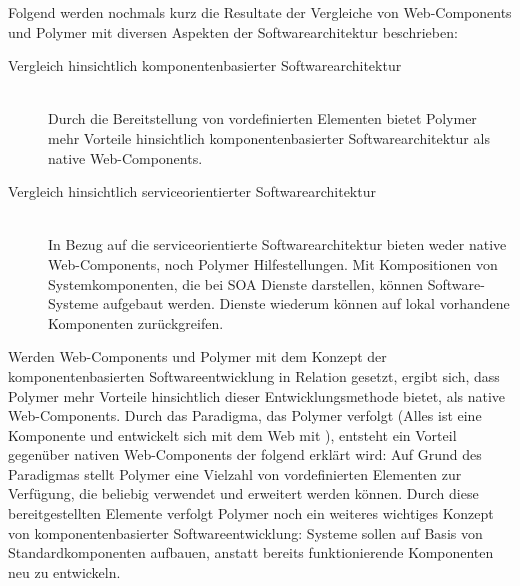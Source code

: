Folgend werden nochmals kurz die Resultate der Vergleiche von Web-Components und Polymer mit diversen Aspekten der Softwarearchitektur beschrieben:

\begin{description}
\item[Vergleich hinsichtlich komponentenbasierter Softwarearchitektur] \hfill \\
Durch die Bereitstellung von vordefinierten Elementen bietet Polymer mehr Vorteile hinsichtlich komponentenbasierter Softwarearchitektur als native Web-Components.

\item[Vergleich hinsichtlich serviceorientierter Softwarearchitektur] \hfill \\
In Bezug auf die serviceorientierte Softwarearchitektur bieten weder native Web-Components, noch Polymer Hilfestellungen. Mit Kompositionen von Systemkomponenten, die bei SOA Dienste darstellen, können Software-Systeme aufgebaut werden. Dienste wiederum können auf lokal vorhandene Komponenten zurückgreifen.
\end{description}

Werden Web-Components und Polymer mit dem Konzept der komponentenbasierten Softwareentwicklung in Relation gesetzt, ergibt sich, dass Polymer mehr Vorteile hinsichtlich dieser Entwicklungsmethode bietet, als native Web-Components. Durch das Paradigma, das Polymer verfolgt (\glqq Alles ist eine Komponente und entwickelt sich mit dem Web mit \grqq ), entsteht ein Vorteil gegenüber nativen Web-Components der folgend erklärt wird: Auf Grund des Paradigmas stellt Polymer eine Vielzahl von vordefinierten Elementen zur Verfügung, die beliebig verwendet und erweitert werden können. Durch diese bereitgestellten Elemente verfolgt Polymer noch ein weiteres wichtiges Konzept von komponentenbasierter Softwareentwicklung: Systeme sollen auf Basis von Standardkomponenten aufbauen, anstatt bereits funktionierende Komponenten neu zu entwickeln.

